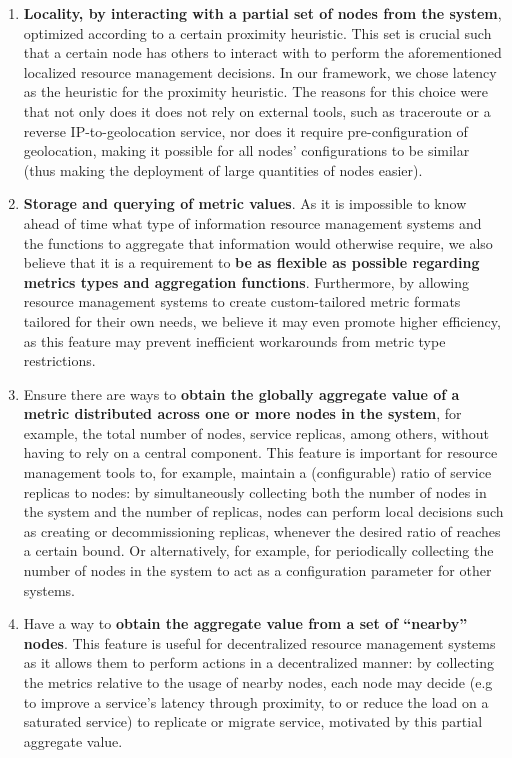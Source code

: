 \begin{enumerate} \label{enum:demmon}

    \item \textbf{Locality, by interacting with a partial set of nodes from the system}, optimized according to a certain proximity heuristic. This set is crucial such that a certain node has others to interact with to perform the aforementioned localized resource management decisions. In our framework, we chose latency as the heuristic for the proximity heuristic. The reasons for this choice were that not only does it does not rely on external tools, such as traceroute or a reverse IP-to-geolocation service, nor does it require pre-configuration of geolocation, making it possible for all nodes' configurations to be similar (thus making the deployment of large quantities of nodes easier). \label{enum:demmon_1}
    
     \item \textbf{Storage and querying of metric values}. As it is impossible to know ahead of time what type of information resource management systems and the functions to aggregate that information would otherwise require, we also believe that it is a requirement to \textbf{be as flexible as possible regarding metrics types and aggregation functions}. Furthermore, by allowing resource management systems to create custom-tailored metric formats tailored for their own needs, we believe it may even promote higher efficiency, as this feature may prevent inefficient workarounds from metric type restrictions. \label{enum:demmon_4}
    
    \item \label{enum:demmon_2} Ensure there are ways to \textbf{obtain the globally aggregate value of a metric distributed across one or more nodes in the system}, for example, the total number of nodes, service replicas, among others, without having to rely on a central component. This feature is important for resource management tools to, for example, maintain a (configurable) ratio of service replicas to nodes: by simultaneously collecting both the number of nodes in the system and the number of replicas, nodes can perform local decisions such as creating or decommissioning replicas, whenever the desired ratio of reaches a certain bound. Or alternatively, for example, for periodically collecting the number of nodes in the system to act as a configuration parameter for other systems. 
    
    \item Have a way to \textbf{obtain the aggregate value from a set of ``nearby'' nodes}. This feature is useful for decentralized resource management systems as it allows them to perform actions in a decentralized manner: by collecting the metrics relative to the usage of nearby nodes, each node may decide (e.g to improve a service's latency through proximity, to or reduce the load on a saturated service) to replicate or migrate service, motivated by this partial aggregate value. \label{enum:demmon_3}
    

\end{enumerate}
